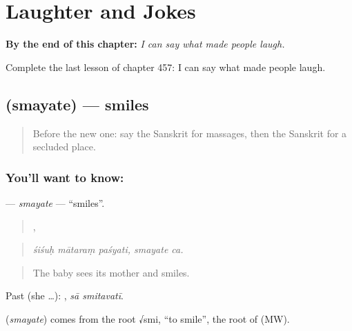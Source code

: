 
\chapter{Laughter and Jokes}
\label{ch:sa-laughter-and-jokes}

\begin{chapteropening}
\textbf{By the end of this chapter:} \emph{I can say what made people laugh.}

Complete the last lesson of chapter 457: I can say what made people laugh.
\end{chapteropening}

\section[\texorpdfstring{\sk{स्मयते} (smayate)}{स्मयते (smayate)}]{ (smayate) — smiles}

\label{lesson:SA-C457-smayate}



\begin{quote}
Before the new one: say the Sanskrit for massages, then the Sanskrit for a secluded place.
\end{quote}

\subsection*{You'll want to know: }
\textbf{} — \emph{smayate} — \textquotedblleft{}smiles\textquotedblright{}.

\begin{quote}
  ,  
\end{quote}

\begin{quote}
\emph{śiśuḥ mātaraṃ paśyati, smayate ca.}
\end{quote}

\begin{quote}
The baby sees its mother and smiles.
\end{quote}

Past (she …):  , \emph{sā smitavatī}.

\begin{cousinweb}
\textbf{} (\emph{smayate}) comes from the root √smi, \textquotedblleft{}to smile\textquotedblright{}, the root of \textbf{} (MW).
\end{cousinweb}

